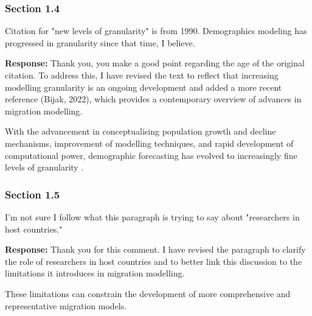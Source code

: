 \documentclass[11pt,a4paper]{article}
\begin{document}
\vspace{0.5cm}

\subsubsection*{Section 1.4}

\begin{reviewbox}
Citation for "new levels of granularity" is from 1990. Demographics modeling has progressed in granularity since that time, I believe.
\end{reviewbox}

\textbf{Response:}
Thank you, you make a good point regarding the age of the original citation. To address this, I have revised the text to reflect that increasing modelling granularity is an ongoing development and added a more recent reference (Bijak, 2022), which provides a contemporary overview of advances in migration modelling.

\vspace{0.5cm}

\begin{updatebox}
With the advancement in conceptualising population growth and decline mechanisms, improvement of modelling techniques, and rapid development of computational power, demographic forecasting has evolved to increasingly fine levels of granularity \citep{106-willekens1990demographic, bijak2022}.
\end{updatebox}

\vspace{0.5cm}

\subsubsection*{Section 1.5}

\begin{reviewbox}
I'm not sure I follow what this paragraph is trying to say about "researchers in host countries."
\end{reviewbox}

\textbf{Response:}
Thank you for this comment. I have revised the paragraph to clarify the role of researchers in host countries and to better link this discussion to the limitations it introduces in migration modelling.

\vspace{0.5cm}

\begin{updatebox}
These limitations can constrain the development of more comprehensive and representative migration models.
\end{updatebox}
\end{document}
